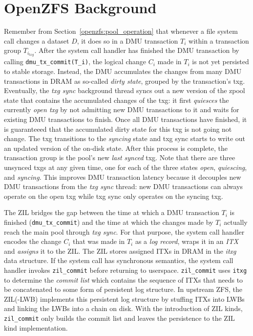 \documentclass[12pt,a4paper,twoside]{book}
\begin{document}
\section{OpenZFS Background} \label{di:prb:background}
Remember from Section~\ref{openzfs:pool_operation} that whenever a file system call changes a dataset $D$, it does so in a DMU transaction $T_i$ within a transaction group $T_{i_{txg}}$.
After the system call handler has finished the DMU transaction by calling \lstinline{dmu_tx_commit(T_i)}, the logical change $C_i$ made in $T_i$ is not yet persisted to stable storage.
Instead, the DMU accumulates the changes from many DMU transactions in DRAM as so-called \textit{dirty state}, grouped by the transaction's txg.
Eventually, the \textit{txg sync} background thread syncs out a new version of the zpool state that contains the accumulated changes of the txg:
it first \textit{quiesces} the currently \textit{open txg} by not admitting new DMU transactions to it and waits for existing DMU transactions to finish.
Once all DMU transactions have finished, it is guaranteeed that the accumulated dirty state for this txg is not going not change.
The txg transitions to the \textit{syncing} state and txg sync starts to write out an updated version of the on-disk state.
After this process is complete, the transaction group is the pool's new \textit{last synced} txg.
Note that there are three unsynced txgs at any given time, one for each of the three states \textit{open}, \textit{quiescing}, and \textit{syncing}.
This improves DMU transaction latency because it decouples new DMU transactions from the \textit{txg sync} thread:
new DMU transactions can always operate on the open txg while txg sync only operates on the syncing txg.

The ZIL bridges the gap between the time at which a DMU transaction $T_i$ is finished (\lstinline{dmu_tx_commit}) and the time at which the changes made by $T_i$ actually reach the main pool through \textit{txg sync}.
For that purpose, the system call handler encodes the change $C_i$ that was made in $T_i$ as a \textit{log record}, wraps it in an \textit{ITX} and \textit{assigns} it to the ZIL.
The ZIL stores assigned ITXs in DRAM in the \textit{itxg} data structure.
If the system call has synchronous semantics, the system call handler invokes \lstinline{zil_commit} before returning to userspace.
\lstinline{zil_commit} uses \lstinline{itxg} to determine the \textit{commit list} which contains the sequence of ITXs that needs to be concatenated to some form of persistent log structure.
In upstream ZFS, the ZIL(-LWB) implements this persistent log structure by stuffing ITXs into LWBs and linking the LWBs into a chain on disk.
With the introduction of ZIL kinds, \lstinline{zil_commit} only builds the commit list and leaves the persistence to the ZIL kind implementation.
\end{document}

